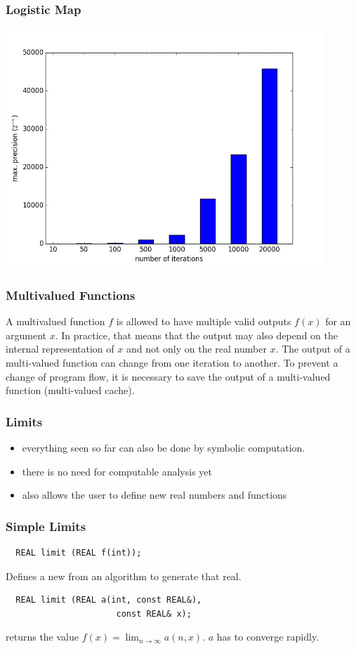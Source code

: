 \begin{frame}
  \frametitle{Logistic Map}
  \centering
  \includegraphics[width=0.9\textwidth]{logmap2}
\end{frame}
\begin{frame}
  \frametitle{Multivalued Functions}
  \large
  A multivalued function $f$ is allowed to have multiple valid outputs $f(x)$ for an argument $x$.
  \pause
  \vfill
  In practice, that means that the output may also depend on the internal representation of $x$
  and not only on the real number $x$.
  \pause
  \vfill
  The output of a multi-valued function can change from one iteration to another.
  To prevent a change of program flow, it is necessary to save the output of a multi-valued function (multi-valued cache).
\end{frame}
\begin{frame}
  \frametitle{Limits}
  \begin{itemize}[<+->]
    \item everything seen so far can also be done by symbolic computation.
    \item there is no need for computable analysis yet
    \item \irram also allows the user to define new real numbers and functions
  \end{itemize}
\end{frame}
\begin{frame}[<+->][fragile]
  \frametitle{Simple Limits}
  \begin{lstlisting}
  REAL limit (REAL f(int));
  \end{lstlisting}
  Defines a new \real from an algorithm to generate that real.
  \vfill
  \pause
  \begin{lstlisting}
  REAL limit (REAL a(int, const REAL&),
                      const REAL& x);
  \end{lstlisting}
  returns the value $f(x) = \lim_{n \to \infty} a(n,x)$.
  $a$ has to converge rapidly.
\end{frame}
